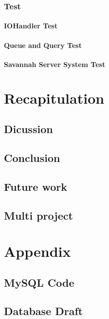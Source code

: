     \subsection{Test}
      
      \subsubsection{IOHandler Test}
      
      \subsubsection{Queue and Query Test}
      
      \subsubsection{Savannah Server System Test}
      

\chapter{Recapitulation}
\label{recap}
  \section{Dicussion}
    
  \section{Conclusion}
    
  \section{Future work}
  \section{Multi project} %

\appendix
    \chapter{Appendix}
    \section{MySQL Code}
    \label{MySQLcode}
      
    \section{Database Draft}
      \label{sec:Databasedrafts}
      
